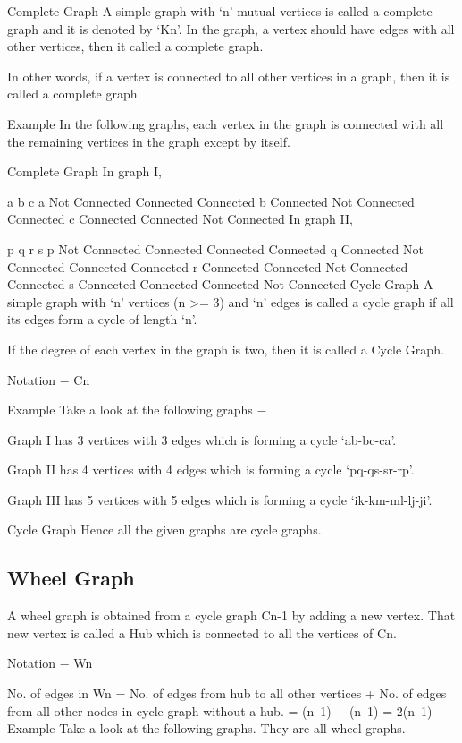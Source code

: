 Complete Graph
A simple graph with ‘n’ mutual vertices is called a complete graph and it is denoted by ‘Kn’. In the graph, a vertex should have edges with all other vertices, then it called a complete graph.

In other words, if a vertex is connected to all other vertices in a graph, then it is called a complete graph.

Example
In the following graphs, each vertex in the graph is connected with all the remaining vertices in the graph except by itself.

Complete Graph
In graph I,

a	b	c
a	Not Connected	Connected	Connected
b	Connected	Not Connected	Connected
c	Connected	Connected	Not Connected
In graph II,

p	q	r	s
p	Not Connected	Connected	Connected	Connected
q	Connected	Not Connected	Connected	Connected
r	Connected	Connected	Not Connected	Connected
s	Connected	Connected	Connected	Not Connected
Cycle Graph
A simple graph with ‘n’ vertices (n >= 3) and ‘n’ edges is called a cycle graph if all its edges form a cycle of length ‘n’.

If the degree of each vertex in the graph is two, then it is called a Cycle Graph.

Notation − Cn

Example
Take a look at the following graphs −

Graph I has 3 vertices with 3 edges which is forming a cycle ‘ab-bc-ca’.

Graph II has 4 vertices with 4 edges which is forming a cycle ‘pq-qs-sr-rp’.

Graph III has 5 vertices with 5 edges which is forming a cycle ‘ik-km-ml-lj-ji’.

Cycle Graph
Hence all the given graphs are cycle graphs.

\subsection{Wheel Graph}
A wheel graph is obtained from a cycle graph Cn-1 by adding a new vertex. That new vertex is called a Hub which is connected to all the vertices of Cn.

Notation − Wn

No. of edges in Wn = No. of edges from hub to all other vertices +
                     No. of edges from all other nodes in cycle graph without a hub.
                     = (n–1) + (n–1)
                     = 2(n–1)
Example
Take a look at the following graphs. They are all wheel graphs.

